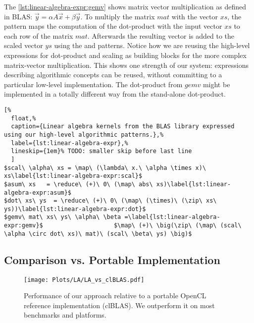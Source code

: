 The \autoref{lst:linear-algebra-expr:gemv} shows matrix vector multiplication as defined in BLAS: $\vec{y} = \alpha A \vec{x} + \beta \vec{y}$.
To multiply the matrix $mat$ with the vector $xs$, the \map pattern maps the computation of the dot-product with the input vector $xs$ to each row of the matrix $mat$.
Afterwards the resulting vector is added to the scaled vector $ys$ using the \zip and \map patterns.
Notice how we are reusing the high-level expressions for dot-product and scaling as building blocks for the more complex matrix-vector multiplication.
This shows one strength of our system: expressions describing algorithmic concepts can be reused, without committing to a particular low-level implementation.
The dot-product from $gemv$ might be implemented in a totally different way from the stand-alone dot-product.

\begin{lstlisting}[%
  float,%
  caption={Linear algebra kernels from the BLAS library expressed using our high-level algorithmic patterns.},%
  label={lst:linear-algebra-expr},%
  lineskip={1em}% TODO: smaller skip before last line
  ]
$scal\ \alpha\ xs = \map\ (\lambda\ x.\ \alpha \times x)\ xs\label{lst:linear-algebra-expr:scal}$
$asum\ xs   = \reduce\ (+)\ 0\ (\map\ abs\ xs)\label{lst:linear-algebra-expr:asum}$
$dot\ xs\ ys  = \reduce\ (+)\ 0\ (\map\ (\times)\ (\zip\ xs\ ys))\label{lst:linear-algebra-expr:dot}$
$gemv\ mat\ xs\ ys\ \alpha\ \beta =\label{lst:linear-algebra-expr:gemv}$                    $\map\ (+)\ \big(\zip\ (\map\ (scal\ \alpha \circ dot\ xs)\ mat)\ (scal\ \beta\ ys) \big)$
\end{lstlisting}




\subsection{Comparison vs. Portable Implementation}

\begin{figure}[t]
  \centering
  \texttt{[image: Plots/LA/LA\_vs\_clBLAS.pdf]}
  \caption{Performance of our approach relative to a portable OpenCL reference implementation (clBLAS).
           We outperform it on most benchmarks and platforms.}
  \label{fig:linear-algebra-expr:clblas}
\end{figure}


